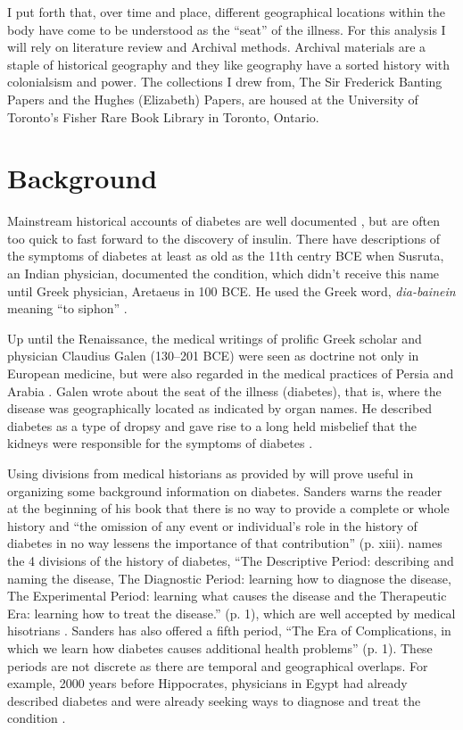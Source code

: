\documentclass[12pt]{article}
\begin{document}
I put forth that, over time and place, different geographical locations within the body have come to be understood as the ``seat'' of the illness.  For this analysis I will rely on literature review and Archival methods. Archival materials are a staple of historical geography and they like geography have a sorted history with colonialsism and power. The collections I drew from, The Sir Frederick Banting Papers and the Hughes (Elizabeth) Papers, are housed at the University of Toronto's Fisher Rare Book Library in Toronto, Ontario. 

\section{Background}
\doublespacing
Mainstream historical accounts of diabetes are well documented \citep{engelhardt_diabetes_1989, tattersall_diabetes_2009}, but are often too quick to fast forward to the discovery of insulin. There have descriptions of the symptoms of diabetes at least as old as the 11th centry BCE when Susruta, an Indian physician, documented the condition, which didn't receive this name until Greek physician, Aretaeus in 100 BCE. He used the Greek word, \textit {dia-bainein} meaning ``to siphon'' \citep{sattley_history_1996}.  

Up until the Renaissance, the medical writings of prolific Greek scholar and physician Claudius Galen (130--201 BCE) were seen as doctrine not only in European medicine, but were also regarded in the medical practices of Persia and Arabia \citep{henschen_1969_term}. Galen wrote about the seat of the illness (diabetes), that is, where the disease was geographically located as indicated by organ names. He described diabetes as a type of dropsy and gave rise to a long held misbelief that the kidneys were responsible for the symptoms of diabetes \citep{henschen_1969_term}. 

Using divisions from medical historians as provided by \citet{sanders_2001_philatelic} will prove useful in organizing some background information on diabetes. Sanders warns the reader at the beginning of his book that there is no way to provide a complete or whole history and ``the omission of any event or individual's role in the history of diabetes in no way lessens the importance of that contribution'' (p. xiii). 
\citet{sanders_2001_philatelic} names the 4 divisions of the history of diabetes, ``The Descriptive Period: describing and naming the disease, The Diagnostic Period: learning how to diagnose the disease, The Experimental Period: learning what causes the disease and the Therapeutic Era: learning how to treat the disease.'' (p. 1), which are well accepted by medical hisotrians \citep{papaspyros_1964_history}. Sanders has also offered a fifth period, ``The Era of Complications, in which we learn how diabetes causes additional health problems'' (p. 1). These periods are not discrete as there are temporal and geographical overlaps. For example, 2000 years before Hippocrates, physicians in Egypt had already described diabetes and were already seeking ways to diagnose and treat the condition \citep{sanders_2001_philatelic}. 
\end{document}
